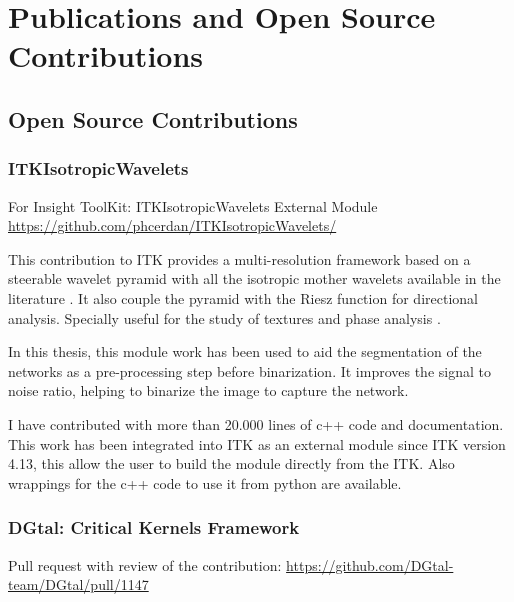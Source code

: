 \chapter{Publications and Open Source Contributions}

\label{Appendix-Contributions}


\section{Open Source Contributions}%
\label{sec:contributions}

\subsection{ITKIsotropicWavelets}%
\label{sub:contribution_itk}
For Insight ToolKit: ITKIsotropicWavelets External Module \url{https://github.com/phcerdan/ITKIsotropicWavelets/}

  This contribution to ITK provides a multi-resolution framework based on a steerable wavelet pyramid \cite{simoncelli_steerable_1995} with all the isotropic mother wavelets available in the literature \cite{held_steerable_2010, pad_vow:_2014}. It also couple the pyramid with the Riesz function \cite{chenouard_3d_2012} for directional analysis. Specially useful for the study of textures \cite{depeursinge_steerable_2017} and phase analysis \cite{held_steerable_2010}.

In this thesis, this module work has been used to aid the segmentation of the networks as a pre-processing step before binarization. It improves the signal to noise ratio, helping to binarize the image to capture the network.

I have contributed with more than 20.000 lines of c++ code and documentation. This work has been
integrated into ITK as an external module since ITK version 4.13, this allow the user to build the module directly from the ITK.
Also wrappings for the c++ code to use it from python are available.

\subsection{DGtal: Critical Kernels Framework}%
\label{sub:contribution_dgtal}

Pull request with review of the contribution:
\url{https://github.com/DGtal-team/DGtal/pull/1147}

